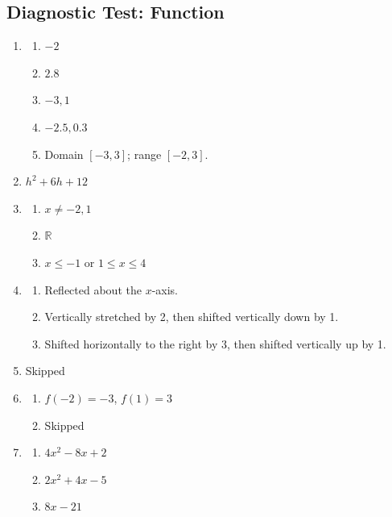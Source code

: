 \documentclass{article}
\begin{document}
\subsection{Diagnostic Test: Function}
\begin{enumerate}
    \item \begin{enumerate}[label=(\alph*)]
              \item $-2$
              \item $2.8$
              \item $-3, 1$
              \item $-2.5, 0.3$
              \item Domain $[-3, 3]$; range $[-2, 3]$.
          \end{enumerate}
    \item $h^2+6h+12$
    \item \begin{enumerate}[label=(\alph*)]
              \item $x \ne -2, 1$
              \item $\mathbb{R}$
              \item $x \le -1$ or $1 \le x \le 4$
          \end{enumerate}
    \item \begin{enumerate}[label=(\alph*)]
              \item Reflected about the $x$-axis.
              \item Vertically stretched by 2, then shifted vertically down by 1.
              \item Shifted horizontally to the right by 3, then shifted vertically up by 1.
          \end{enumerate}
    \item Skipped
    \item \begin{enumerate}[label=(\alph*)]
              \item $f(-2) = -3$, $f(1) = 3$
              \item Skipped
          \end{enumerate}
    \item \begin{enumerate}[label=(\alph*)]
              \item $4x^2-8x+2$
              \item $2x^2+4x-5$
              \item $8x-21$
          \end{enumerate}
\end{enumerate}
\end{document}
